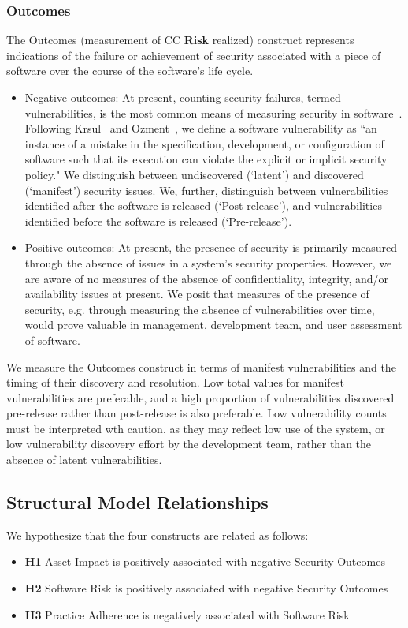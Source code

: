\subsubsection{Outcomes}
\label{sec:model_contruct_outcome}
The Outcomes (measurement of CC \textbf{Risk} realized) construct represents indications of the failure or achievement of security associated with a piece of software over the course of the software's life cycle.

\begin{itemize}
	\item Negative outcomes: At present, counting security failures, termed vulnerabilities, is the most common means of measuring security in software~\cite{morrison2014mapping}. Following Krsul~\cite{krsul1998software} and Ozment~\cite{ozment2007vulnerability}, we define a software vulnerability as “an instance of a mistake in the specification, development, or configuration of software such that its execution can violate the explicit or implicit security policy." We distinguish between undiscovered (`latent') and discovered (`manifest') security issues. We, further, distinguish between vulnerabilities identified after the software is released (`Post-release'), and vulnerabilities identified before the software is released (`Pre-release'). 
	\item Positive outcomes: 
	At present, the presence of security is primarily measured through the absence of issues in a system's security properties.  However, we are aware of no measures of the absence of confidentiality, integrity, and/or availability issues at present. We posit that measures of the presence of security, e.g. through measuring the absence of vulnerabilities over time, would prove valuable in management, development team, and user assessment of software.	
\end{itemize} 

We measure the Outcomes construct in terms of manifest vulnerabilities and the timing of their discovery and resolution. Low total values for manifest vulnerabilities are preferable, and a high proportion of vulnerabilities discovered pre-release rather than post-release is also preferable. Low vulnerability counts must be interpreted wth caution, as they may reflect low use of the system, or low vulnerability discovery effort by the development team, rather than the absence of latent vulnerabilities. 

\subsection{Structural Model Relationships}
We hypothesize that the four constructs are related as follows:
\begin{itemize}
	\item \textbf{H1} Asset Impact is positively associated with negative Security Outcomes
	\item \textbf{H2} Software Risk is positively associated with negative Security Outcomes
	\item \textbf{H3} Practice Adherence is negatively associated with Software Risk 	
\end{itemize}

